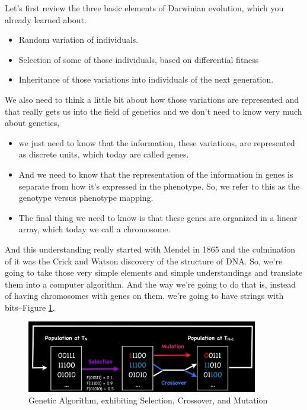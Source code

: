 \documentclass[]{article}
\begin{document}
Let's first review the three basic elements of Darwinian evolution, which you already learned about.

\begin{itemize}
	\item Random variation of individuals.

	\item Selection of some of those individuals, based on differential fitness
	
	\item Inheritance of those variations into individuals of the next generation.
\end{itemize}

We also need to think a little bit about
how those variations are represented
and that really gets us into the field of genetics
and we don't need to know very
much about genetics, \begin{itemize}
	\item we just need to know that the information, these variations, are represented as discrete units, which today are called genes.

	\item And we need to know that the representation of the information in genes is separate from how it's expressed in the phenotype. So, we refer to this as the genotype versus phenotype mapping.

	\item The final thing we need to know is that these genes are organized in a linear array, which today we call a chromosome.
\end{itemize}

And this understanding really started with Mendel in 1865 and the culmination of it was the Crick and Watson discovery of the structure of DNA.
So, we're going to take those very simple
elements and simple understandings and
translate them into a computer algorithm.
And the way we're going to do that is,
instead of having chromosomes with genes
on them, we're going to have strings with bits--Figure \ref{fig:GeneticAlgorithm}.

\begin{figure}[H]
	\caption[Genetic Algorithm, exhibiting Selection, Crossover, and Mutation]{Genetic Algorithm, exhibiting Selection, Crossover, and Mutation\cite{holland1992adaptation}}\label{fig:GeneticAlgorithm}
	\includegraphics[width=0.9\textwidth]{GeneticAlgorithm}
\end{figure}
\end{document}
